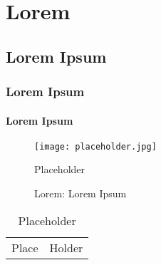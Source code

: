 \documentclass[../thesis.tex]{subfiles}
\begin{document}
\chapter{Lorem}\label{chap:lorem}

\lipsum[1-1] \citep{suprapti2017}

\section{Lorem Ipsum}

\lipsum[2-2]

\subsection{Lorem Ipsum}

\lipsum[3-3]

\subsubsection{Lorem Ipsum}

\lipsum[4-4]

\begin{figure}[htpb]
    \centering
    \texttt{[image: placeholder.jpg]}
    \caption{Placeholder}
    \caption*{Lorem: Lorem Ipsum}
    \label{fig:place}
\end{figure}

\begin{table}[htpb]
    \centering
    \caption{Placeholder}
    \label{tab:holder}
    \begin{tabular}{ll}
    Place & Holder \\
    \end{tabular}
\end{table}

\end{document}
